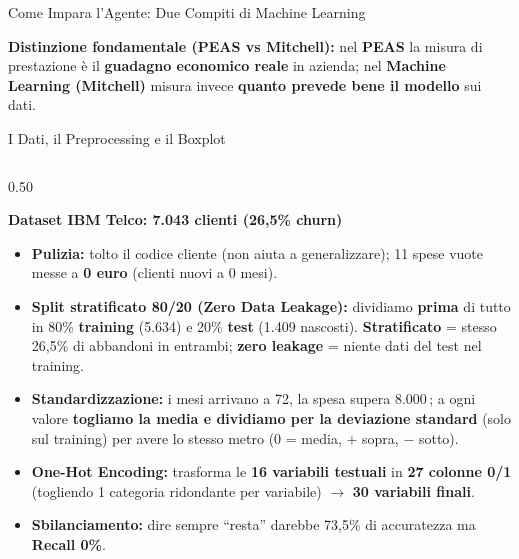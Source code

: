 \documentclass[aspectratio=169, 10pt]{beamer}
\newcommand{\card}[3]{%
    \colorbox{#1}{\parbox{\dimexpr#2-2\fboxsep\relax}{\raggedright #3}}%
}
\begin{document}
\begin{frame}{Come Impara l'Agente: Due Compiti di Machine Learning}
    \vspace{2.6mm}
    \card{CardAmber}{\textwidth}{\footnotesize
        \textbf{\color{PrimaryNavy} Distinzione fondamentale (PEAS vs Mitchell):} nel \textbf{PEAS} la misura di prestazione è il \textbf{guadagno economico reale} in azienda; nel \textbf{Machine Learning (Mitchell)} misura invece \textbf{quanto prevede bene il modello} sui dati.
    }
\end{frame}

\begin{frame}{I Dati, il Preprocessing e il Boxplot}
    \begin{columns}[c, onlytextwidth]
        \begin{column}{0.50\textwidth}
            \raggedright
            \textbf{\color{PrimaryNavy}\small Dataset IBM Telco: 7.043 clienti (26,5\% churn)}
            \vspace{1.2mm}

            \begin{itemize}
                \setlength{\itemsep}{2.4pt}
                \scriptsize
                \item \textbf{Pulizia:} tolto il codice cliente (non aiuta a generalizzare); 11 spese vuote messe a \textbf{0 euro} (clienti nuovi a 0 mesi).
                \item \textbf{Split stratificato 80/20 (Zero Data Leakage):} dividiamo \textbf{prima} di tutto in 80\% \textbf{training} (5.634) e 20\% \textbf{test} (1.409 nascosti). \textbf{Stratificato} = stesso 26,5\% di abbandoni in entrambi; \textbf{zero leakage} = niente dati del test nel training.
                \item \textbf{Standardizzazione:} i mesi arrivano a 72, la spesa supera 8.000\,\texteuro; a ogni valore \textbf{togliamo la media e dividiamo per la deviazione standard} (solo sul training) per avere lo stesso metro (0 = media, $+$ sopra, $-$ sotto).
                \item \textbf{One-Hot Encoding:} trasforma le \textbf{16 variabili testuali} in \textbf{27 colonne 0/1} (togliendo 1 categoria ridondante per variabile) $\rightarrow$ \textbf{30 variabili finali}.
                \item \textbf{Sbilanciamento:} dire sempre ``resta'' darebbe 73,5\% di accuratezza ma \textbf{Recall 0\%}.
            \end{itemize}
        \end{column}


\end{columns}
\end{frame}
\end{document}
